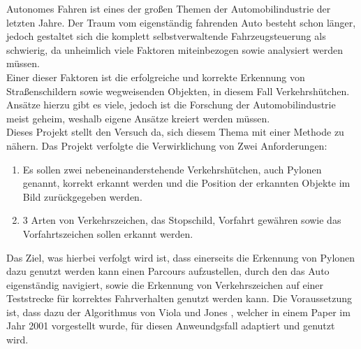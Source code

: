 Autonomes Fahren ist eines der großen Themen der Automobilindustrie der letzten Jahre. Der Traum vom eigenständig fahrenden Auto besteht schon länger, jedoch gestaltet sich die komplett selbstverwaltende Fahrzeugsteuerung als schwierig, da unheimlich viele Faktoren miteinbezogen sowie analysiert werden müssen.\\
Einer dieser Faktoren ist die erfolgreiche und korrekte Erkennung von Straßenschildern sowie wegweisenden Objekten, in diesem Fall Verkehrshütchen. Ansätze hierzu gibt es viele, jedoch ist die Forschung der Automobilindustrie meist geheim, weshalb eigene Ansätze kreiert werden müssen.\\
Dieses Projekt stellt den Versuch da, sich diesem Thema mit einer Methode zu nähern. Das Projekt verfolgte die Verwirklichung von Zwei Anforderungen:
\begin{enumerate}
\item Es sollen zwei nebeneinanderstehende Verkehrshütchen, auch Pylonen genannt, korrekt erkannt werden und die Position der erkannten Objekte im Bild zurückgegeben werden.
\item 3 Arten von Verkehrszeichen, das Stopschild, Vorfahrt gewähren sowie das Vorfahrtszeichen sollen erkannt werden.
\end{enumerate}
Das Ziel, was hierbei verfolgt wird ist, dass einerseits die Erkennung von Pylonen dazu genutzt werden kann einen Parcours aufzustellen, durch den das Auto eigenständig navigiert, sowie die Erkennung von Verkehrszeichen auf einer Teststrecke für korrektes Fahrverhalten genutzt werden kann. Die Voraussetzung ist, dass dazu der Algorithmus von Viola und Jones , welcher in einem Paper im Jahr 2001 vorgestellt wurde, für diesen Anweundgsfall adaptiert und genutzt wird.